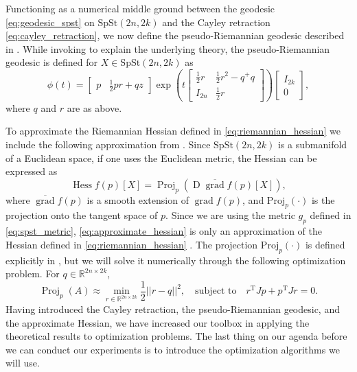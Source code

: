 Functioning as a numerical middle ground between the geodesic \eqref{eq:geodesic_spst} on $\mathrm{SpSt}(2n, 2k)$ and the Cayley retraction \eqref{eq:cayley_retraction}, we now define the pseudo-Riemannian geodesic described in \cite[p.~10]{BendokatZimmermann2021}. While invoking \cite{BendokatZimmermann2021} to explain the underlying theory, the pseudo-Riemannian geodesic is defined for $X\in \mathrm{SpSt}(2n, 2k)$ as 
%
\begin{equation*}
\phi(t)=\begin{bmatrix}
p & \frac{1}{2}pr+qz
\end{bmatrix}\exp\left( t\begin{bmatrix}
\frac{1}{2}r  & \frac{1}{2}r^{2}-q^{+}q \\
I_{2n} & \frac{1}{2}r
\end{bmatrix} \right)
\begin{bmatrix}
I_{2k} \\
0
\end{bmatrix},
\end{equation*}
%
where $q$ and $r$ are as above. 

To approximate the Riemannian Hessian defined in \eqref{eq:riemannian_hessian} we include the following approximation from \cite[Corr.~5.16]{Boumal2023}. Since $\mathrm{SpSt}(2n, 2k)$ is a submanifold of a Euclidean space, if one uses the Euclidean metric, the Hessian can be expressed as
%
\begin{equation}\label{eq:approximate_hessian}
\operatorname{Hess}f(p)[X]=\operatorname{Proj}_{p}(\operatorname{D}\overline{\operatorname{grad}}f(p)[X]),
\end{equation}
%
where $\overline{\operatorname{grad}}f(p)$ is a smooth extension of $\operatorname{grad}f(p)$, and $\mathrm{Proj}_{p}(\cdot)$ is the projection onto the tangent space of $p$. Since we are using the metric $g_p$ defined in \eqref{eq:spst_metric}, \eqref{eq:approximate_hessian} is only an approximation of the Hessian defined in \eqref{eq:riemannian_hessian} \cite[p.~11]{JensenZimmermann2024}. The projection $\mathrm{Proj}_{p}(\cdot)$ is defined explicitly in \cite[Lemma~2.3]{JensenZimmermann2024}, but we will solve it numerically through the following optimization problem. For $q\in \mathbb{R}^{2n\times 2k}$,
%
\begin{equation*}
\operatorname{Proj}_{p}(A)\approx \operatorname*{min}_{r\in \mathbb{R}^{2n\times2k}} \frac{1}{2}\lvert \lvert r-q \rvert  \rvert ^{2},\quad\text{subject to}\quad r^{\mathrm{T}}Jp+p^{\mathrm{T}}Jr=0.
\end{equation*}
%
Having introduced the Cayley retraction, the pseudo-Riemannian geodesic, and the approximate Hessian, we have increased our toolbox in applying the theoretical results to optimization problems. The last thing on our agenda before we can conduct our experiments is to introduce the optimization algorithms we will use. 